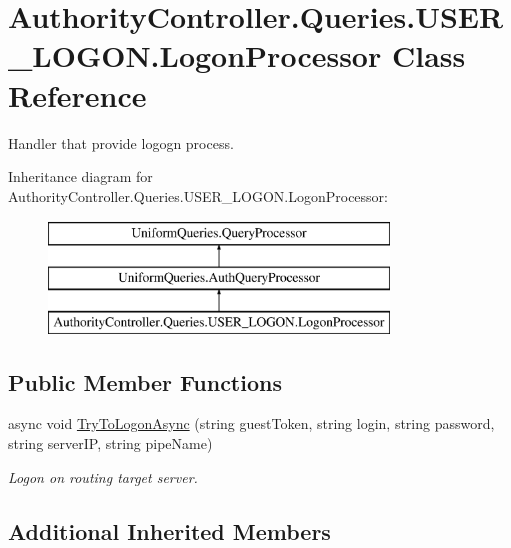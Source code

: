\hypertarget{class_authority_controller_1_1_queries_1_1_u_s_e_r___l_o_g_o_n_1_1_logon_processor}{}\section{Authority\+Controller.\+Queries.\+U\+S\+E\+R\+\_\+\+L\+O\+G\+O\+N.\+Logon\+Processor Class Reference}
\label{class_authority_controller_1_1_queries_1_1_u_s_e_r___l_o_g_o_n_1_1_logon_processor}


Handler that provide logogn process.  


Inheritance diagram for Authority\+Controller.\+Queries.\+U\+S\+E\+R\+\_\+\+L\+O\+G\+O\+N.\+Logon\+Processor\+:\begin{figure}[H]
\begin{center}
\leavevmode
\includegraphics[height=3.000000cm]{db/d30/class_authority_controller_1_1_queries_1_1_u_s_e_r___l_o_g_o_n_1_1_logon_processor}
\end{center}
\end{figure}
\subsection*{Public Member Functions}
\begin{DoxyCompactItemize}
\item 
async void \mbox{\hyperlink{class_authority_controller_1_1_queries_1_1_u_s_e_r___l_o_g_o_n_1_1_logon_processor_a5073849b4aec752f2fb1b68f11561985}{Try\+To\+Logon\+Async}} (string guest\+Token, string login, string password, string server\+IP, string pipe\+Name)
\begin{DoxyCompactList}\small\item\em Logon on routing target server. \end{DoxyCompactList}\end{DoxyCompactItemize}
\subsection*{Additional Inherited Members}


